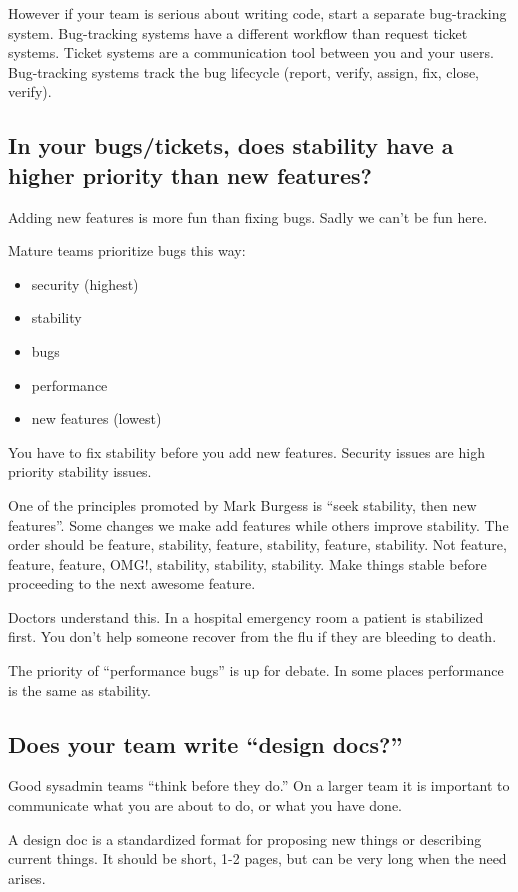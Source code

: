 \documentclass{article}
\begin{document}
However if your team is serious about writing code, start a separate bug-tracking system. Bug-tracking systems have a different workflow than request ticket systems. Ticket systems are a communication tool between you and your users. Bug-tracking systems track the bug lifecycle (report, verify, assign, fix, close, verify).

\subsection{In your bugs/tickets, does stability have a higher priority than new features?}
Adding new features is more fun than fixing bugs. Sadly we can't be fun here.

Mature teams prioritize bugs this way:

\begin{itemize}
    \item security (highest)
    \item stability
    \item bugs
    \item performance
    \item new features (lowest)
\end{itemize}

You have to fix stability before you add new features. Security issues are high priority stability issues.

One of the principles promoted by Mark Burgess is ``seek stability, then new features''. Some changes we make add features while others improve stability. The order should be feature, stability, feature, stability, feature, stability. Not feature, feature, feature, OMG!, stability, stability, stability. Make things stable before proceeding to the next awesome feature.

Doctors understand this. In a hospital emergency room a patient is stabilized first. You don't help someone recover from the flu if they are bleeding to death.

The priority of ``performance bugs'' is up for debate. In some places performance is the same as stability.

\subsection{Does your team write ``design docs?''}
Good sysadmin teams ``think before they do.'' On a larger team it is important to communicate what you are about to do, or what you have done.

A design doc is a standardized format for proposing new things or describing current things. It should be short, 1-2 pages, but can be very long when the need arises.
\end{document}
